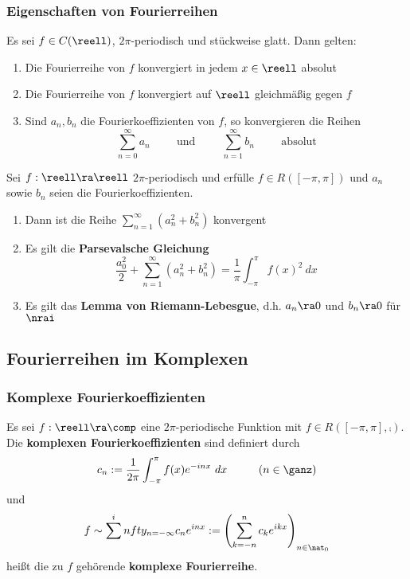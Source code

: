 \documentclass{kit}
\begin{document}
    \subsubsection{Eigenschaften  von Fourierreihen}
      Es sei $f\in C(\reell)$, $2\pi$-periodisch und stückweise glatt. Dann gelten:
      \begin{enumerate}
        \item Die Fourierreihe von $f$ konvergiert in jedem $x\in\reell$ absolut
        \item Die Fourierreihe von $f$ konvergiert auf $\reell$ gleichmäßig gegen $f$
        \item Sind $a_n,b_n$ die Fourierkoeffizienten von $f$, so konvergieren die Reihen
          $$\sum^\infty_{n=0}a_n\hspace{1cm}\text{und}\hspace{1cm}\sum^\infty_{n=1}b_n\hspace{1cm}\text{absolut}$$
      \end{enumerate}
      Sei $f:\reell\ra\reell$ $2\pi$-periodisch und erfülle $f\in R([-\pi,\pi])$ und $a_n$ sowie $b_n$ seien die
      Fourierkoeffizienten.
      \begin{enumerate}
        \item Dann ist die Reihe $\sum^\infty_{n=1}(a^2_n+b^2_n)$ konvergent
        \item Es gilt die \textbf{Parsevalsche Gleichung}
          $$\frac{a^2_0}{2}+\sum^\infty_{n=1}(a^2_n+b^2_n)=\frac{1}{\pi}\int^\pi_{-\pi}f(x)^2\ dx$$
        \item Es gilt das \textbf{Lemma von Riemann-Lebesgue}, d.h. $a_n\ra0$ und $b_n\ra0$ für $\nrai$
      \end{enumerate}
  \subsection{Fourierreihen im Komplexen}
    \subsubsection{Komplexe Fourierkoeffizienten}
      Es sei $f:\reell\ra\comp$ eine $2\pi$-periodische Funktion mit $f\in R([-\pi,\pi],\comp)$. Die \textbf{komplexen
      Fourierkoeffizienten} sind definiert durch
      $$c_n:=\frac{1}{2\pi}\int^\pi_{-\pi}f(x)e^{-inx}\ dx\hspace{1cm}(n\in\ganz)$$
      und
      $$f\sim\sum^infty_{n=-\infty}c_ne^{inx}:=\left(\sum^n_{k=-n}c_ke^{ikx}\right)_{n\in\nat_0}$$
      heißt die zu $f$ gehörende \textbf{komplexe Fourierreihe}.
\end{document}
